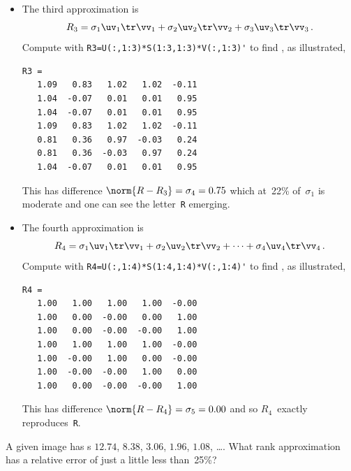 \begin{example}
\begin{solution}
\begin{itemize}
 
\item 
\begin{figbox}{}%
The third approximation is 
\begin{equation*}
R_3=\sigma_1\uv_1\tr\vv_1 +\sigma_2\uv_2\tr\vv_2 +\sigma_3\uv_3\tr\vv_3\,.
\end{equation*}
Compute with \verb|R3=U(:,1:3)*S(1:3,1:3)*V(:,1:3)'| to find \twodp, as illustrated, 
\end{figbox}
\begin{verbatim}
R3 =
   1.09   0.83   1.02   1.02  -0.11
   1.04  -0.07   0.01   0.01   0.95
   1.04  -0.07   0.01   0.01   0.95
   1.09   0.83   1.02   1.02  -0.11
   0.81   0.36   0.97  -0.03   0.24
   0.81   0.36  -0.03   0.97   0.24
   1.04  -0.07   0.01   0.01   0.95
\end{verbatim}
This has difference \(\norm{R-R_3}=\sigma_4=0.75\) which at~22\% of~\(\sigma_1\) is moderate and one can see the letter~\verb|R| emerging.
 
\item 
\begin{figbox}{}%
The fourth approximation is 
\begin{equation*}
R_4=\sigma_1\uv_1\tr\vv_1+\sigma_2\uv_2\tr\vv_2+\cdots+\sigma_4\uv_4\tr\vv_4\,.
\end{equation*}
Compute with \verb|R4=U(:,1:4)*S(1:4,1:4)*V(:,1:4)'| to find \twodp, as illustrated, 
\reParshape
\end{figbox}
\begin{verbatim}
R4 =
   1.00   1.00   1.00   1.00  -0.00
   1.00   0.00  -0.00   0.00   1.00
   1.00   0.00  -0.00  -0.00   1.00
   1.00   1.00   1.00   1.00  -0.00
   1.00  -0.00   1.00   0.00  -0.00
   1.00  -0.00  -0.00   1.00   0.00
   1.00   0.00  -0.00  -0.00   1.00
\end{verbatim}
This has difference \(\norm{R-R_4}=\sigma_5=0.00\) and so \(R_4\)~exactly reproduces~\verb|R|.
\aqed
 
\end{itemize}
\end{solution}
\end{example}




\begin{activity}
A given image has s \(12.74\), \(8.38\), \(3.06\), \(1.96\), \(1.08\), \ldots. 
What rank approximation has a relative error of just a little less than~25\%?
\end{activity}





